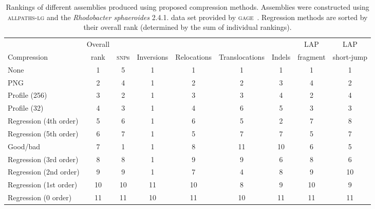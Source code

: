 \documentclass{bioinfo}
\begin{document}
\begin{table}[!tpb]
\centering
\caption[]{Rankings of different assemblies produced using proposed compression methods. Assemblies were constructed using \textsc{allpaths-lg} and the \textit{Rhodobacter sphaeroides} 2.4.1. data set provided by \textsc{gage}~\cite{salzberg2012gage}. Regression methods are sorted by their overall rank (determined by the sum of individual rankings).}
{\begin{tabular}{lcccccccc}
& Overall & & & & & & LAP & LAP \\
Compression            & rank & \textsc{snp}s & Inversions & Relocations & Translocations & Indels & fragment & short-jump \\
\hline
None                   & 1    & 5    & 1          & 1           & 1              & 1      & 1          & 1                    \\
PNG                    & 2    & 4    & 1          & 2           & 2              & 3      & 4          & 2                    \\
Profile (256)          & 3    & 2    & 1          & 3           & 3              & 4      & 2          & 4                    \\
Profile (32)           & 4    & 3    & 1          & 4           & 6              & 5      & 3          & 3                    \\
Regression (4th order) & 5    & 6    & 1          & 6           & 5              & 2      & 7          & 8                    \\
Regression (5th order) & 6    & 7    & 1          & 5           & 7              & 7      & 5          & 7                    \\
Good/bad               & 7    & 1    & 1          & 8           & 11             & 10     & 6          & 5                    \\
Regression (3rd order) & 8    & 8    & 1          & 9           & 9              & 6      & 8          & 6                    \\
Regression (2nd order) & 9    & 9    & 1          & 7           & 4              & 8      & 9          & 10                   \\
Regression (1st order) & 10   & 10   & 11         & 10          & 8              & 9      & 10         & 9                    \\
Regression (0 order) & 11   & 11   & 10         & 11          & 10             & 11     & 11         & 11
\\ \hline
\end{tabular}
}
\label{tab:assembly_ranks}
\end{table}
\end{document}
